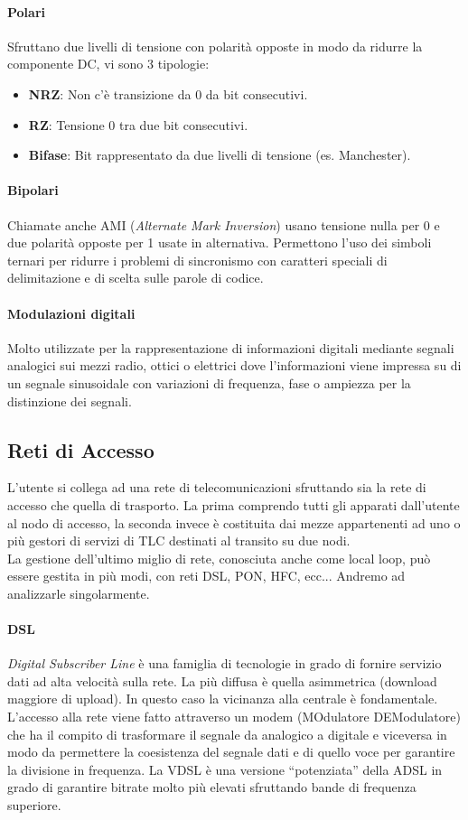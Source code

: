 \documentclass[12pt]{article}
\begin{document}
\paragraph{Polari}
Sfruttano due livelli di tensione con polarità opposte in modo da ridurre la componente DC, vi sono 3 tipologie:
\begin{itemize}
  \item \textbf{NRZ}: Non c'è transizione da 0 da bit consecutivi.
  \item \textbf{RZ}: Tensione 0 tra due bit consecutivi.
  \item \textbf{Bifase}: Bit rappresentato da due livelli di tensione (es. Manchester).
\end{itemize}
\paragraph{Bipolari}
Chiamate anche AMI (\textit{Alternate Mark Inversion}) usano tensione nulla per 0 e due polarità opposte per 1 usate in alternativa. Permettono l'uso dei simboli ternari per ridurre i problemi di sincronismo con caratteri speciali di delimitazione e di scelta sulle parole di codice.
\paragraph{Modulazioni digitali}
Molto utilizzate per la rappresentazione di informazioni digitali mediante segnali analogici sui mezzi radio, ottici o elettrici dove l'informazioni viene impressa su di un segnale sinusoidale con variazioni di frequenza, fase o ampiezza per la distinzione dei segnali. %

\subsection{Reti di Accesso}
L'utente si collega ad una rete di telecomunicazioni sfruttando sia la rete di accesso che quella di trasporto. La prima comprendo tutti gli apparati dall'utente al nodo di accesso, la seconda invece è costituita dai mezze appartenenti ad uno o più gestori di servizi di TLC destinati al transito su due nodi.\\
La gestione dell'ultimo miglio di rete, conosciuta anche come local loop, può essere gestita in più modi, con reti DSL, PON, HFC, ecc... Andremo ad analizzarle singolarmente.
\paragraph{DSL}
\textit{Digital Subscriber Line} è una famiglia di tecnologie in grado di fornire servizio dati ad alta velocità sulla rete. La più diffusa è quella asimmetrica (download maggiore di upload). In questo caso la vicinanza alla centrale è fondamentale.\\
L'accesso alla rete viene fatto attraverso un modem (MOdulatore DEModulatore) che ha il compito di trasformare il segnale da analogico a digitale e viceversa in modo da permettere la coesistenza del segnale dati e di quello voce per garantire la divisione in frequenza. La VDSL è una versione ``potenziata'' della ADSL in grado di garantire bitrate molto più elevati sfruttando bande di frequenza superiore.
\end{document}
